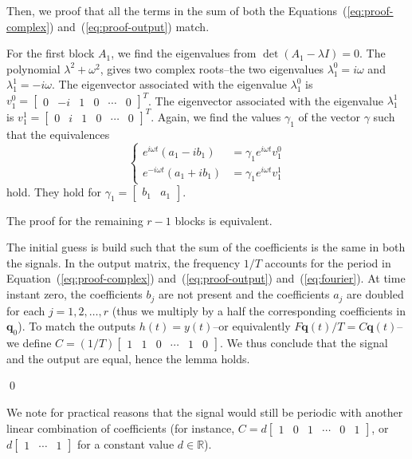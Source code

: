 \documentclass[letterpaper,10pt,conference]{ieeeconf}
\theoremstyle{definition}
\begin{document}
Then, we proof that all the terms in the sum of both the Equations~(\ref{eq:proof-complex}) and~(\ref{eq:proof-output}) match. 

For the first block $A_1$, we find the eigenvalues from $\det(A_1-\lambda I)=0$. The polynomial $\lambda^2+\omega^2$, gives two complex roots--the two eigenvalues $\lambda_1^0=i\omega$ and $\lambda_1^1=-i\omega$. The eigenvector associated with the eigenvalue $\lambda_1^0$ is $v_1^0=\begin{bmatrix}0 & -i&1&0&\cdots&0\end{bmatrix}^T$. The eigenvector associated with the eigenvalue $\lambda_1^1$ is $v_1^1=\begin{bmatrix}0&i&1&0&\cdots&0\end{bmatrix}^T$. Again, we find the values $\gamma_1$ of the vector $\gamma$ such that the equivalences 
\begin{equation*}\begin{cases}
  e^{i\omega t}(a_1-ib_1)&=\gamma_1 e^{i\omega t}v_1^0\\
  e^{-i\omega t}(a_1+ib_1)&=\gamma_1 e^{i\omega t}v_1^1
\end{cases}\end{equation*}
hold. They hold for $\gamma_1=\begin{bmatrix}b_1&a_1\end{bmatrix}$. 

The proof for the remaining $r-1$ blocks is equivalent.

The initial guess is build such that the sum of the coefficients is the same in both the signals. In the output matrix, the frequency $1/T$ accounts for the period in Equation~(\ref{eq:proof-complex}) and~(\ref{eq:proof-output}) and~(\ref{eq:fourier}). At time instant zero, the coefficients $b_j$ are not present and the coefficients $a_j$ are doubled for each $j=1,2,\dots,r$ (thus we multiply by a half the corresponding coefficients in $\mathbf{q}_0$). To match the outputs $h(t)=y(t)$--or equivalently $F\mathbf{q}(t)/T=C\mathbf{q}(t)$--we define $C=(1/T)\begin{bmatrix}1 & 1 & 0 & \cdots & 1 & 0\end{bmatrix}$. We thus conclude that the signal and the output are equal, hence the lemma holds.

\qed

We note for practical reasons that the signal would still be periodic with another linear combination of coefficients (for instance, $C=d\begin{bmatrix}1 & 0 & 1 & \cdots & 0 & 1\end{bmatrix}$, or $d\begin{bmatrix}1 & \cdots & 1\end{bmatrix}$ for a constant value $d\in\mathbb{R}$).
\end{document}
